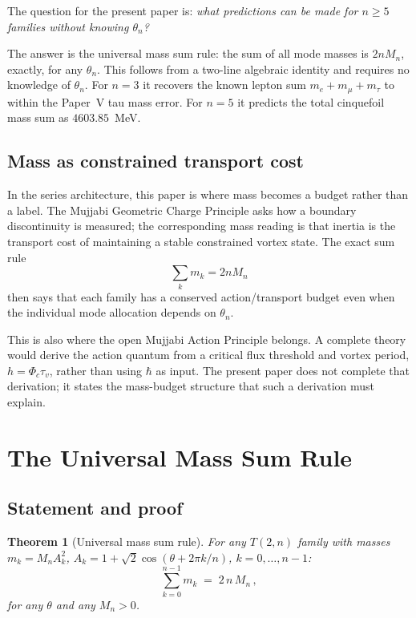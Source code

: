 \documentclass[11pt]{article}
\newtheorem{theorem}{Theorem}
\begin{document}
The question for the present paper is: \emph{what predictions can be made
for $n \geq 5$ families without knowing $\theta_n$?}

The answer is the universal mass sum rule: the sum of all mode masses is
$2nM_n$, exactly, for any $\theta_n$.
This follows from a two-line algebraic identity and requires no knowledge
of $\theta_n$.
For $n = 3$ it recovers the known lepton sum $m_e + m_\mu + m_\tau$ to
within the Paper~V tau mass error.
For $n = 5$ it predicts the total cinquefoil mass sum as $4603.85$~MeV.

\subsection{Mass as constrained transport cost}

In the series architecture, this paper is where mass becomes a budget rather
than a label. The Mujjabi Geometric Charge Principle asks how a boundary
discontinuity is measured; the corresponding mass reading is that inertia is the
transport cost of maintaining a stable constrained vortex state. The exact sum
rule
\[
  \sum_k m_k=2nM_n
\]
then says that each family has a conserved action/transport budget even when
the individual mode allocation depends on $\theta_n$.

This is also where the open Mujjabi Action Principle belongs. A complete theory
would derive the action quantum from a critical flux threshold and vortex
period, $h=\Phi_c\tau_v$, rather than using $\hbar$ as input. The present paper
does not complete that derivation; it states the mass-budget structure that such
a derivation must explain.


\section{The Universal Mass Sum Rule}
\label{sec:sum_rule}

\subsection{Statement and proof}

\begin{theorem}[Universal mass sum rule]
  \label{thm:sum_rule}
  For any $T(2,n)$ family with masses $m_k = M_n A_k^2$,
  $A_k = 1 + \sqrt{2}\cos(\theta + 2\pi k/n)$, $k = 0,\ldots,n-1$:
  \begin{equation}
    \sum_{k=0}^{n-1} m_k \;=\; 2\,n\,M_n\,,
    \label{eq:sum_rule}
  \end{equation}
  for any $\theta$ and any $M_n > 0$.
\end{theorem}
\end{document}
